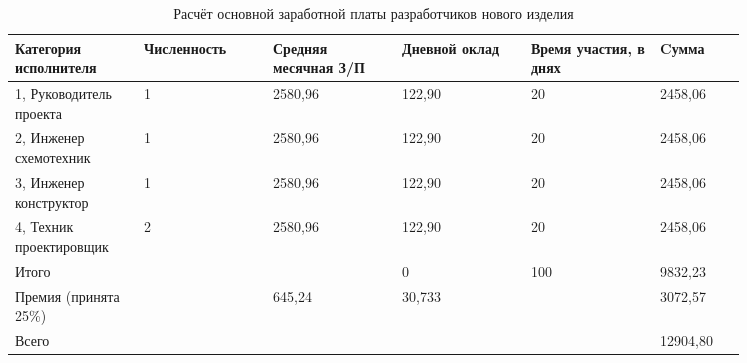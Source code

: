 \begin{table}[H]
  \small
  \caption{Расчёт основной заработной платы
    разработчиков нового изделия}
  \begin{tabular}{|p{0.15\linewidth}|p{0.15\linewidth}|p{0.15\linewidth}|p{0.15\linewidth}|p{0.15\linewidth}|p{0.1\linewidth}|}
    \hline
Категория исполнителя & Численность & Средняя месячная З/П & Дневной оклад & Время участия, в днях & Cумма\\[0pt]
\hline
    1, Руководитель проекта & 1 & 2580,96 & 122,90 & 20 & 2458,06\\[0pt]
    \hline
    2, Инженер схемотехник & 1 & 2580,96 & 122,90 & 20 & 2458,06\\[0pt]
    \hline
    3, Инженер конструктор & 1 & 2580,96 & 122,90 & 20 & 2458,06\\[0pt]
    \hline
    4, Техник проектировщик & 2 & 2580,96 & 122,90 & 20 & 2458,06\\[0pt]
    \hline
    Итого &  &  & 0 & 100 & 9832,23\\[0pt]
    \hline
    Премия (принята 25\%) &  & 645,24 & 30,733 &  & 3072,57\\[0pt]
    \hline
    Всего &  &  &   &  & 12904,80\\[0pt]
    \hline
\end{tabular}
\end{table}

